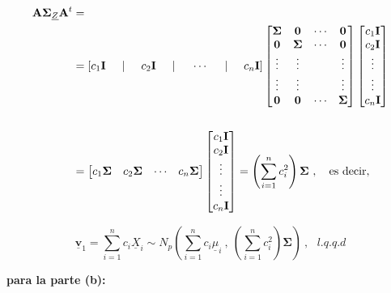 \documentclass[
]{book}
\theoremstyle{definition}
\theoremstyle{definition}
\theoremstyle{definition}
\theoremstyle{definition}
\theoremstyle{remark}
\begin{document}
\begin{align*}
\mathbf{A} \mathbf{\Sigma}_{\underline{Z}} \mathbf{A}^t&= \\
&= \left[c_1\mathbf{I} \hspace{0.5cm}| \hspace{0.5cm} c_2\mathbf{I}  \hspace{0.5cm}| \hspace{0.5cm} \cdots  \hspace{0.5cm}| \hspace{0.5cm} c_n\mathbf{I} \right]\begin{bmatrix}
\mathbf{\Sigma} & \mathbf{0} & \cdots & \mathbf{0}\\
\mathbf{0} & \mathbf{\Sigma} & \cdots & \mathbf{0}\\
\vdots & \vdots &  & \vdots \\
\vdots & \vdots &  & \vdots \\
\mathbf{0} & \mathbf{0} & \cdots &  \mathbf{\Sigma}
\end{bmatrix}\begin{bmatrix}
c_1\mathbf{I} \\ c_2 \mathbf{I} \\ \vdots \\ \vdots \\ c_n \mathbf{I}
\end{bmatrix}  \\ \\ 
& =\begin{bmatrix}
c_1\mathbf{\Sigma} & c_2\mathbf{\Sigma} & \cdots & c_n\mathbf{\Sigma} 
\end{bmatrix}   \begin{bmatrix}
c_1\mathbf{I} \\ c_2 \mathbf{I} \\ \vdots \\ \vdots \\ c_n \mathbf{I}
\end{bmatrix} =  \left( \sum_{i=1}^n c_i^2 \right) \mathbf{\Sigma} \ , \  \ \ \text{es decir},
\end{align*}

\[\underline{\mathbf{v}}_1=\sum_{i=1}^n c_i\underline{X}_i \sim N_p \left( \sum_{i=1}^n c_i \underline{\mu}_i \ , \  \left( \sum_{i=1}^n c_i^2 \right) \mathbf{\Sigma} \right)\ , \ \ \ l.q.q.d
\]

\textbf{para la parte (b):}
\end{document}
